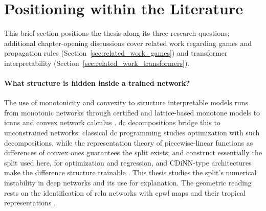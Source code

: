 \section{Positioning within the Literature}\label{sec:related_work}

This brief section positions the thesis along its three research questions; additional chapter-opening discussions cover related work regarding games and propagation rules (Section~\ref{sec:related_work_games}) and transformer interpretability (Section~\ref{sec:related_work_transformers}).

\paragraph{What structure is hidden inside a trained network?}
The use of monotonicity and convexity to structure interpretable models runs from monotonic networks \parencite{Sill1997_MonotonicNetworks,Daniels2010_MonotoneNN} through certified and lattice-based monotone models \parencite{Liu2020CertifiedMonotone,Gupta2016MonotoneLattice,Sivaraman2020_COMET,Nguyen2023_MonoNet,Runje_2023} to \acp{icnn} \parencite{Amos2017} and convex network calculus \parencite{Bach2017ConvexNN,Calafiore2019DLSE,sivaprasad2021curious}. \ac{dc} decompositions bridge this to unconstrained networks: classical \ac{dc} programming \parencite{Tao1997_DCProgramming,LeThi2018DCA,Sriperumbudur2009CCCP} studies optimization with such decompositions, while the representation theory of piecewise-linear functions as differences of convex ones \parencite{Melzer1986_PLasDC,Kripfganz1987_PWAasDC,Zalgaller2000_DCRepresentation,Griewank2020_PolyhedralDCDecomposition,Schlueter2021_ConvexDecompPAF,Koutschan2024_MinimalArity,Kazda2024_LP_DCPLA,Brandenburg2025_DecompositionPolyhedra} guarantees the split exists; \textcite{Awasthi2023DCNN} and \textcite{Siahkamari2020_DCRegression} construct essentially the split used here, for optimization and regression, and CDiNN-type architectures make the difference structure trainable \parencite{Sankaranarayanan2021CDINN,Chen2025_RCDiNN}. This thesis studies the split's numerical instability in deep networks and its use for explanation. The geometric reading rests on the identification of \ac{relu} networks with \ac{cpwl} maps \parencite{Arora2018,BalestrieroBaraniuk2018MadMax,huchette2025deeplearningmeetspolyhedral} and their tropical representations \parencite{Zhang2018}.


